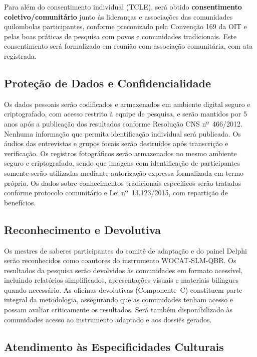 \documentclass[12pt,a4paper,brazil]{article}
\begin{document}
Para além do consentimento individual (TCLE), será obtido \textbf{consentimento coletivo/comunitário} junto às lideranças e associações das comunidades quilombolas participantes, conforme preconizado pela Convenção 169 da OIT e pelas boas práticas de pesquisa com povos e comunidades tradicionais. Este consentimento será formalizado em reunião com associação comunitária, com ata registrada.

\subsection{Proteção de Dados e Confidencialidade}

Os dados pessoais serão codificados e armazenados em ambiente digital seguro e criptografado, com acesso restrito à equipe de pesquisa, e serão mantidos por 5 anos após a publicação dos resultados conforme Resolução CNS nº~466/2012. Nenhuma informação que permita identificação individual será publicada. Os áudios das entrevistas e grupos focais serão destruídos após transcrição e verificação. Os registros fotográficos serão armazenados no mesmo ambiente seguro e criptografado, sendo que imagens com identificação de participantes somente serão utilizadas mediante autorização expressa formalizada em termo próprio. Os dados sobre conhecimentos tradicionais específicos serão tratados conforme protocolo comunitário e Lei nº~13.123/2015, com repartição de benefícios.

\subsection{Reconhecimento e Devolutiva}

Os mestres de saberes participantes do comitê de adaptação e do painel Delphi serão reconhecidos como coautores do instrumento WOCAT-SLM-QBR. Os resultados da pesquisa serão devolvidos às comunidades em formato acessível, incluindo relatórios simplificados, apresentações visuais e materiais bilíngues quando necessário. As oficinas devolutivas (Componente~C) constituem parte integral da metodologia, assegurando que as comunidades tenham acesso e possam avaliar criticamente os resultados. Será também disponibilizado às comunidades acesso ao instrumento adaptado e aos dossiês gerados.

\subsection{Atendimento às Especificidades Culturais}
\end{document}
